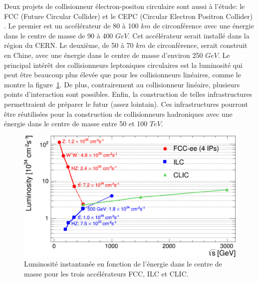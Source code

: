 Deux projets de collisionneur électron-positon circulaire sont aussi à l'étude: le FCC (Future Circular Collider) \cite{fcc-ee} et le CEPC (Circular Electron Positron Collider) \cite{cepc}. Le premier est un accélérateur de 80 à 100 $km$ de circonférence avec une énergie dans le centre de masse de 90 à 400 $GeV$. Cet accélérateur serait installé dans la région du CERN. Le deuxième, de 50 à 70 $km$ de circonférence, serait construit en Chine, avec une énergie dans le centre de masse d'environ 250 $GeV$. Le principal intérêt des collisionneurs leptoniques circulaires est la luminosité qui peut être beaucoup plus élevée que pour les collisionneurs linéaires, comme le montre la figure~\ref{fig:fccLumi}.
De plus, contrairement au collisionneur linéaire, plusieurs points d'interaction sont possibles. Enfin, la construction de telles infrastructures permettraient de préparer le futur (assez lointain). Ces infrastructures pourront être réutilisées pour la construction de collisionneurs hadroniques avec une énergie dans le centre de masse entre 50 et 100 $TeV$. 
\begin{figure}[!h]
  \begin{center}
    \includegraphics[width=1.0\textwidth]{ILC/figs/fcc_ilc_clic_lumi.png}
    \caption{Luminosité instantanée en fonction de l'énergie dans le centre de masse pour les trois accélérateurs FCC, ILC et CLIC.}
    \label{fig:fccLumi}
  \end{center}
\end{figure}
